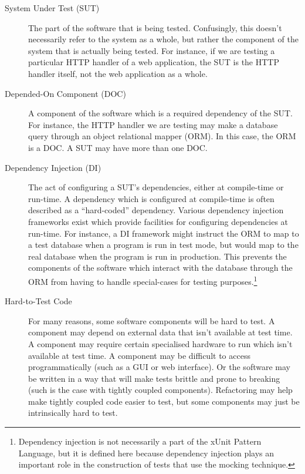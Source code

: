 \begin{description}

\item[System Under Test (SUT)] The part of the software that is being
  tested. Confusingly, this doesn't necessarily refer to the system as
  a whole, but rather the component of the system that is actually
  being tested. For instance, if we are testing a particular HTTP
  handler of a web application, the SUT is the HTTP handler itself,
  not the web application as a whole.

\item[Depended-On Component (DOC)] A component of the software which
  is a required dependency of the SUT. For instance, the HTTP handler
  we are testing may make a database query through an object
  relational mapper (ORM). In this case, the ORM is a DOC. A SUT may
  have more than one DOC.

\item[Dependency Injection (DI)] The act of configuring a SUT's
  dependencies, either at compile-time or run-time. A dependency which
  is configured at compile-time is often described as a ``hard-coded''
  dependency. Various dependency injection frameworks exist which
  provide facilities for configuring dependencies at run-time. For
  instance, a DI framework might instruct the ORM to map to a test
  database when a program is run in test mode, but would map to the
  real database when the program is run in production. This prevents
  the components of the software which interact with the database
  through the ORM from having to handle special-cases for testing
  purposes.\footnote{Dependency injection is not necessarily a part
    of the xUnit Pattern Language, but it is defined here because
    dependency injection plays an important role in the construction
    of tests that use the mocking technique.}

\item[Hard-to-Test Code] For many reasons, some software components
  will be hard to test. A component may depend on external data that
  isn't available at test time. A component may require certain
  specialised hardware to run which isn't available at test time. A
  component may be difficult to access programmatically (such as a GUI
  or web interface). Or the software may be written in a way that will
  make tests brittle and prone to breaking (such is the case with
  tightly coupled components). Refactoring may help make tightly
  coupled code easier to test, but some components may just be
  intrinsically hard to test.


\end{description}
